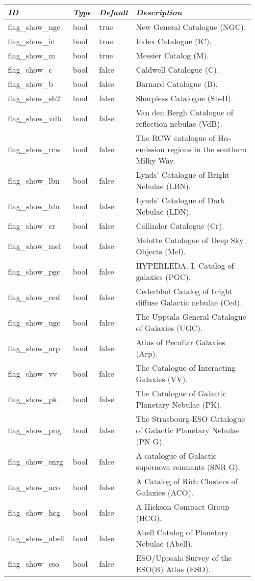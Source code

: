 \begin{longtable}{l|l|l|p{90mm}}\toprule
\emph{ID} & \emph{Type} & \emph{Default} & \emph{Description}\\\midrule
flag\_show\_ngc  & bool & true  & New General Catalogue (NGC). \\%
flag\_show\_ic   & bool & true  & Index Catalogue (IC). \\%
flag\_show\_m    & bool & true  & Messier Catalog (M). \\%
flag\_show\_c    & bool & false & Caldwell Catalogue (C). \\%
flag\_show\_b    & bool & false & Barnard Catalogue (B). \\%
flag\_show\_sh2  & bool & false & Sharpless Catalogue (Sh-II). \\%
flag\_show\_vdb  & bool & false & Van den Bergh Catalogue of reflection nebulae (VdB). \\%
flag\_show\_rcw  & bool & false & The RCW catalogue of H$\alpha$-emission regions in the southern Milky Way. \\%
flag\_show\_lbn  & bool & false & Lynds' Catalogue of Bright Nebulae (LBN). \\%
flag\_show\_ldn  & bool & false & Lynds' Catalogue of Dark Nebulae (LDN). \\%
flag\_show\_cr   & bool & false & Collinder Catalogue (Cr). \\%
flag\_show\_mel  & bool & false & Melotte Catalogue of Deep Sky Objects (Mel).  \\%
flag\_show\_pgc  & bool & false & HYPERLEDA. I. Catalog of galaxies (PGC). \\%
flag\_show\_ced  & bool & false & Cederblad Catalog of bright diffuse Galactic nebulae (Ced). \\%
flag\_show\_ugc  & bool & false & The Uppsala General Catalogue of Galaxies (UGC). \\%
flag\_show\_arp  & bool & false & Atlas of Peculiar Galaxies (Arp). \\%
flag\_show\_vv   & bool & false & The Catalogue of Interacting Galaxies (VV). \\%
flag\_show\_pk   & bool & false & The Catalogue of Galactic Planetary Nebulae (PK). \\%
flag\_show\_png  & bool & false & The Strasbourg-ESO Catalogue of Galactic Planetary Nebulae (PN G). \\%
flag\_show\_snrg & bool & false & A catalogue of Galactic supernova remnants (SNR G). \\%
flag\_show\_aco  & bool & false & A Catalog of Rich Clusters of Galaxies (ACO). \\%
flag\_show\_hcg  & bool & false & A Hickson Compact Group (HCG). \\%
flag\_show\_abell  & bool & false & Abell Catalog of Planetary Nebulae (Abell). \\%
flag\_show\_eso  & bool & false & ESO/Uppsala Survey of the ESO(B) Atlas (ESO). \\\bottomrule
\end{longtable}

